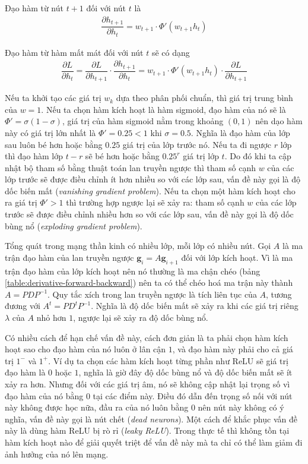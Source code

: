 Đạo hàm từ nút $t+1$ đối với nút $t$ là
\begin{align}
    \dfrac{\partial h_{t+1}}{\partial h_t}=w_{t+1}\cdot\Phi'(w_{t+1}h_t)
\end{align}

Đạo hàm từ hàm mất mát đối với nút $t$ sẽ có dạng
\begin{align}
    \dfrac{\partial L}{\partial h_t}=\dfrac{\partial L}{\partial h_{t+1}}\cdot\dfrac{\partial h_{t+1}}{\partial h_t}=w_{t+1}\cdot\Phi'(w_{t+1}h_t)\cdot\dfrac{\partial L}{\partial h_{t+1}}
\end{align}

Nếu ta khởi tạo các giá trị $w_k$ dựa theo phân phối chuẩn, thì giá trị trung bình của $w=1$. Nếu ta chọn hàm kích hoạt là hàm sigmoid, đạo hàm của nó sẽ là $\Phi'=\sigma(1-\sigma)$, giá trị của hàm sigmoid nằm trong khoảng $(0,1)$ nên dạo hàm này có giá trị lớn nhất là $\Phi'=0.25<1$ khi $\sigma=0.5$. Nghĩa là đạo hàm của lớp sau luôn bé hơn hoặc bằng $0.25$ giá trị của lớp trước nó. Nếu ta đi ngược $r$ lớp thì đạo hàm lớp $t-r$ sẽ bé hơn hoặc bằng $0.25^r$ giá trị lớp $t$. Do đó khi ta cập nhật bộ tham số bằng thuật toán lan truyền ngược thì tham số cạnh $w$ của các lớp trước sẽ được điều chỉnh ít hơn nhiều so với các lớp sau, vấn đề này gọi là độ dốc biến mất (\textit{vanishing gradient problem}). Nếu ta chọn một hàm kích hoạt cho ra giá trị $\Phi'>1$ thì trường hợp ngược lại sẽ xảy ra: tham số cạnh $w$ của các lớp trước sẽ được điều chỉnh nhiều hơn so với các lớp sau, vấn đề này gọi là độ dốc bùng nổ (\textit{exploding gradient problem}).

Tổng quát trong mạng thần kinh có nhiều lớp, mỗi lớp có nhiều nút. Gọi $A$ là ma trận đạo hàm của lan truyền ngược $\mathbf g_i = A\mathbf g_{i+1}$ đối với lớp kích hoạt. Vì là ma trận đạo hàm của lớp kích hoạt nên nó thường là ma chận chéo (bảng \ref{table:derivative-forward-backward}) nên ta có thể chéo hoá ma trận này thành $A=PDP^{-1}$. Quy tắc xích trong lan truyền ngược là tích liên tục của $A$, tương đương với $A^t=PD^tP^{-1}$. Nghĩa là độ dốc biến mất sẽ xảy ra khi các giá trị riêng $\lambda$ của $A$ nhỏ hơn $1$, ngược lại sẽ xảy ra độ dốc bùng nổ. \cite{Aggarwal2023}

Có nhiều cách để hạn chế vấn đề này, cách đơn giản là ta phải chọn hàm kích hoạt sao cho đạo hàm của nó luôn ở lân cận $1$, và đạo hàm này phải cho cả giá trị $1^-$ và $1^+$. Ví dụ ta chọn các hàm kích hoạt từng phần như ReLU sẽ giá trị đạo hàm là $0$ hoặc $1$, nghĩa là giờ đây độ dốc bùng nổ và độ dốc biến mất sẽ ít xảy ra hơn. Nhưng đối với các giá trị âm, nó sẽ không cập nhật lại trọng số vì đạo hàm của nó bằng $0$ tại các điểm này. Điều đó dẫn đến trọng số nối với nút này không được học nữa, đầu ra của nó luôn bằng $0$ nên nút này không có ý nghĩa, vấn đề này gọi là nút chết (\textit{dead neurons}). Một cách để khắc phục vấn đề này là dùng hàm ReLU bị rò rỉ (\textit{leaky ReLU}). Trong thực tế thì không tồn tại hàm kích hoạt nào để giải quyết triệt để vấn đề này mà ta chỉ có thể làm giảm đi ảnh hưởng của nó lên mạng.
